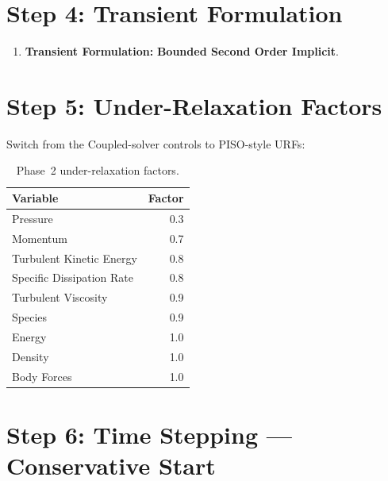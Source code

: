 \documentclass[12pt,a4paper]{report}
\begin{document}
\noindent{}


\section{Step 4: Transient Formulation}

\begin{enumerate}
  \item \textbf{Transient Formulation:} \textbf{Bounded Second Order
        Implicit}.
\end{enumerate}


\section{Step 5: Under-Relaxation Factors}

Switch from the Coupled-solver controls to PISO-style URFs:

\begin{table}[H]
\centering
\caption{Phase~2 under-relaxation factors.}
\begin{tabular}{@{}lr@{}}
\toprule
\textbf{Variable} & \textbf{Factor} \\
\midrule
Pressure                     & 0.3 \\
Momentum                     & 0.7 \\
Turbulent Kinetic Energy     & 0.8 \\
Specific Dissipation Rate    & 0.8 \\
Turbulent Viscosity          & 0.9 \\
Species                      & 0.9 \\
Energy                       & 1.0 \\
Density                      & 1.0 \\
Body Forces                  & 1.0 \\
\bottomrule
\end{tabular}
\end{table}


\section{Step 6: Time Stepping --- Conservative Start}
\end{document}
